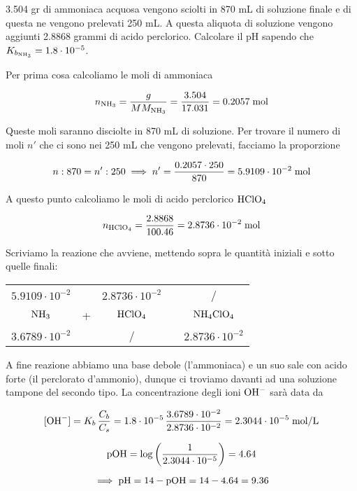\newpage

\begin{esercizio}
    3.504 gr di ammoniaca acquosa vengono sciolti in 870 mL di soluzione finale e di questa ne vengono prelevati 250 mL. A questa aliquota di soluzione vengono aggiunti 2.8868 grammi di acido perclorico. Calcolare il pH sapendo che $K_{b_{\rm NH_3}}=1.8 \cdot 10^{-5}$.
\end{esercizio}
\begin{soluzione}
    Per prima cosa calcoliamo le moli di ammoniaca

$$n_{\rm NH_3}
=\frac{g}{MM_{\rm NH_3}}
=\frac{3.504}{17.031}
=0.2057 \; \rm mol$$

Queste moli saranno disciolte in 870 mL di soluzione. Per trovare il numero di moli $n'$ che ci sono nei 250 mL che vengono prelevati, facciamo la proporzione

$$n:870=n':250
\implies
n'=\frac{0.2057 \cdot 250}{870}
=5.9109 \cdot 10^{-2} \; \rm mol$$

A questo punto calcoliamo le moli di acido perclorico $\rm HClO_4$

$$n_{\rm HClO_4}=\frac{2.8868}{100.46}=2.8736 \cdot 10^{-2} \; \rm mol$$

Scriviamo la reazione che avviene, mettendo sopra le quantità iniziali e sotto quelle finali:

\begin{center}
    \begin{tabular}{ccccc}
        $5.9109 \cdot 10^{-2}$ &  & $2.8736 \cdot 10^{-2}$ & & /\\
        $\rm NH_3$ & + & $\rm HClO_4$ & \ce{->} & $\rm NH_4ClO_4$\\
        $3.6789 \cdot 10^{-2}$ &  & / & & $2.8736 \cdot 10^{-2}$\\
    \end{tabular}
\end{center}

A fine reazione abbiamo una base debole (l'ammoniaca) e un suo sale con acido forte (il perclorato d'ammonio), dunque ci troviamo davanti ad una soluzione tampone del secondo tipo. La concentrazione degli ioni $\rm OH^-$ sarà data da

$$[\text{OH}^-]=K_b\,\frac{C_b}{C_s}
=1.8 \cdot 10^{-5}\,\frac{3.6789 \cdot 10^{-2}}{2.8736 \cdot 10^{-2}}
=2.3044 \cdot 10^{-5} \; \rm mol/L$$

$$\rm pOH=\log \left( \frac{1}{2.3044 \cdot 10^{-5}} \right)=4.64$$

$$\implies \rm pH=14-pOH=14-4.64=9.36$$

\end{soluzione}

